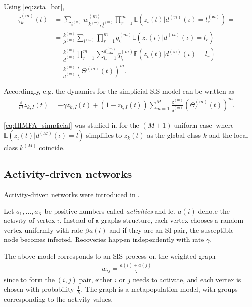 \documentclass{article}
\newcommand{\E}{\mathbb{E}}
\renewcommand{\d}{\mathrm{d}}
\newcommand{\1}[1]{{\mathds{1}}_{\left\{#1\right\}}}
\newcommand{\rem}[1]{{#1}}
\begin{document}
	Using \eqref{eq:zeta_bar},
	\begin{align*}
		\bar{\zeta}_{k}^{(m)}(t)&=\sum_{\underline{l}^{(m)}} \bar{w}_{k^{(m)},\underline{j}^{(m)}}^{(m)}\prod_{r=1}^{m}\E \left(\left. z_{\iota}(t) \right| d^{(m)}(\iota)=l_r^{(m)} \right)=\\
		&= \frac{k^{(m)}}{\bar{d}^{(m)}}\sum_{\underline{l}^{(m)}} \prod_{r=1}^{m}q_{l_r}^{(m)}\E \left(\left.z_{\iota}(t) \right| d^{(m)}(\iota)=l_r \right)\\
		&= \frac{k^{(m)}}{\bar{d}^{(m)}} \prod_{r=1}^{m}\sum_{l_r=1}^{d_{\textrm{max}}^{(m)}}q_{l_r}^{(m)}\E \left(\left.z_{\iota}(t) \right| d^{(m)}(\iota)=l_r \right)=\\
		&= \frac{k^{(m)}}{\bar{d}^{(m)}} \left(\Theta^{(m)}(t) \right)^m.
	\end{align*}
	
	Accordingly, e.g. the dynamics for the simplicial SIS model can be written as
	\begin{align}
		\label{eq:IHMFA_simplicial}
		\frac{\d}{\d t}\bar{z}_{k,I}(t)=-\gamma \bar{z}_{k,I}(t)+(1-\bar{z}_{k,I}(t))\sum_{m=1}^{M} \frac{\beta^{(m)}}{\bar{d}^{(m)}}\left(\Theta_{I}^{(m)}(t) \right)^{m} \rem{.}
	\end{align}
	
	\eqref{eq:IHMFA_simplicial} was studied in \cite{simplicial3} for the $(M+1)$-uniform case, where $\E \left(\left.z_{\iota}(t) \right| d^{(M)}(\iota)=l \right)$ simplifies to $\bar{z}_{k}(t)$ as the global class $k$ and the local class $k^{(M)}$ coincide. %
	
	\subsection{Activity-driven networks}
	
	Activity-driven networks  were introduced in  \cite{activity1}.
	
	Let $a_1, \dots, a_K$ be positive numbers called \emph{activities} and let $a(i)$ denote the activity of vertex $i$. Instead of a graphs structure, each vertex chooses a random vertex uniformly with rate $\beta a(i)$ and if they are an SI pair, the susceptible node becomes infected. Recoveries happen independently with rate $\gamma.$
	
	The above model corresponds to an SIS process on the weighted graph
	\begin{align*}
		w_{ij}=\frac{a(i)+a(j)}{N}
	\end{align*} 
	since  to form the $(i,j)$ pair, either $i$ or $j$ needs to activate, and each vertex is chosen with probability $\frac{1}{N}.$ The graph is a metapopulation model, with groups corresponding to the activity values.
	
\end{document}
